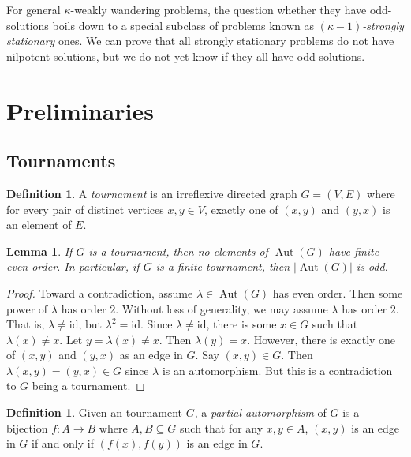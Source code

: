\documentclass[11pt]{amsart}
\newtheorem{lemma}[theorem]{Lemma}
\theoremstyle{definition}
\newtheorem{definition}[theorem]{Definition}
\theoremstyle{definition}
\numberwithin{equation}{section}
\DeclareMathOperator{\Aut}{Aut}
\begin{document}
For general $\kappa$-weakly wandering problems, the question whether they have odd-solutions boils down to a special subclass of problems known as \emph{$(\kappa-1)$-strongly stationary} ones. We can prove that all strongly stationary problems do not have nilpotent-solutions, but we do not yet know if they all have odd-solutions.




\section{Preliminaries}


\subsection{Tournaments}

\begin{definition} A {\em tournament} is an irreflexive directed graph $G=(V, E)$ where for every pair of distinct vertices $x, y\in V$, exactly one of $(x,y)$ and $(y,x)$ is an element of $E$.
\end{definition}


\begin{lemma}\label{lem:aut} If $G$ is a tournament, then no elements of $\Aut(G)$ have finite even order. In particular, if $G$ is a finite tournament, then $|\Aut(G)|$ is odd.
\end{lemma}

\begin{proof} Toward a contradiction, assume $\lambda\in \Aut(G)$ has even order. Then some power of $\lambda$ has order $2$. Without loss of generality, we may assume $\lambda$ has order $2$. That is, $\lambda\neq \mbox{id}$, but $\lambda^2=\mbox{id}$. Since $\lambda\neq\mbox{id}$, there is some $x\in G$ such that $\lambda(x)\neq x$. Let $y=\lambda(x)\neq x$. Then $\lambda(y)=x$. However, there is exactly one of $(x, y)$ and $(y,x)$ as an edge in $G$. Say $(x,y)\in G$. Then $\lambda(x,y)=(y,x)\in G$ since $\lambda$ is an automorphism. But this is a contradiction to $G$ being a tournament. 
\end{proof}

\begin{definition} Given an tournament $G$, a {\em partial automorphism} of $G$ is a bijection $f\colon A\to B$ where $A, B\subseteq G$ such that for any $x, y\in A$, $(x, y)$ is an edge in $G$ if and only if $(f(x), f(y))$ is an edge in $G$.
\end{definition}
\end{document}
